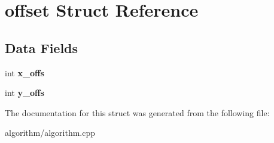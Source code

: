 \hypertarget{structoffset}{
\section{offset Struct Reference}
\label{structoffset}
}
\subsection*{Data Fields}
\begin{DoxyCompactItemize}
\item 
\hypertarget{structoffset_a9a752cb34c2da231803eda23a4b19e04}{
int {\bfseries x\_\-offs}}
\label{structoffset_a9a752cb34c2da231803eda23a4b19e04}

\item 
\hypertarget{structoffset_a592ea2f80d851d6f2067f13116a83109}{
int {\bfseries y\_\-offs}}
\label{structoffset_a592ea2f80d851d6f2067f13116a83109}

\end{DoxyCompactItemize}


The documentation for this struct was generated from the following file:\begin{DoxyCompactItemize}
\item 
algorithm/algorithm.cpp\end{DoxyCompactItemize}
